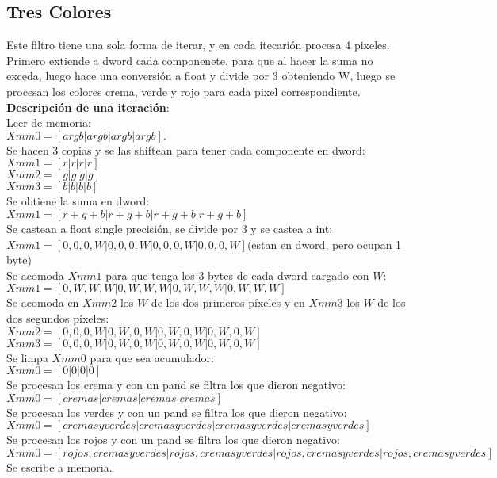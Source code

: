 \vspace{5px}
\subsection{Tres Colores} 


Este filtro tiene una sola forma de iterar, y en cada itecarión procesa 4 pixeles. Primero extiende a dword cada componenete, para que al hacer la suma no exceda, luego hace una conversión a float y divide por 3 obteniendo W, luego se procesan los colores crema, verde y rojo para cada pixel correspondiente.\\
\textbf{Descripción de una iteración}:\\
Leer de memoria:\\
$Xmm0 = [argb| argb| argb | argb].$\\
Se hacen 3 copias y se las shiftean para tener cada componente en dword:\\ 
$Xmm1 = [r| r| r| r]$\\
$Xmm2 = [g| g| g| g]$\\
$Xmm3 = [b| b| b| b]$\\
Se obtiene la suma en dword:\\
$Xmm1 = [r+g+b| r+g+b| r+g+b| r+g+b]$\\
Se castean a float single precisión, se divide por 3 y se castea a int:\\
$Xmm1 = [0,0,0,W| 0,0,0,W| 0,0,0,W| 0,0,0,W]$(estan en dword, pero ocupan 1 byte)\\
Se acomoda $Xmm1$ para que tenga los 3 bytes de cada dword cargado con $W$:\\
$Xmm1 = [0,W,W,W| 0,W,W,W| 0,W,W,W| 0,W,W,W]$\\
Se acomoda en $Xmm2$ los $W$ de los dos primeros píxeles y en $Xmm3$ los $W$ de los dos segundos píxeles:\\
$Xmm2 = [0,0,0,W|0,W,0,W|0,W,0,W|0,W,0,W]$\\
$Xmm3 = [0,0,0,W|0,W,0,W|0,W,0,W|0,W,0,W]$\\
Se limpa $Xmm0$ para que sea acumulador:\\
$Xmm0 = [0|0|0|0]$\\
Se procesan los crema y con un pand se filtra los que dieron negativo:\\
$Xmm0 = [cremas|cremas|cremas|cremas]$\\
Se procesan los verdes y con un pand se filtra los que dieron negativo:\\
$Xmm0 = [cremas y verdes|cremas y verdes|cremas y verdes|cremas y verdes]$\\
Se procesan los rojos y con un pand se filtra los que dieron negativo:\\
$Xmm0 = [rojos, cremas y verdes|rojos, cremas y verdes|rojos, cremas y verdes|rojos, cremas y verdes]$\\
Se escribe a memoria.\\



